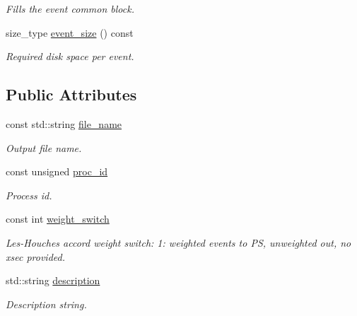 \begin{DoxyCompactItemize}
\begin{DoxyCompactList}\small\item\em Fills the event common block. \end{DoxyCompactList}\item 
\hypertarget{a00327_aab8e06d09a764122a89115144a83fb44}{}size\+\_\+type \hyperlink{a00327_aab8e06d09a764122a89115144a83fb44}{event\+\_\+size} () const \label{a00327_aab8e06d09a764122a89115144a83fb44}

\begin{DoxyCompactList}\small\item\em Required disk space per event. \end{DoxyCompactList}\end{DoxyCompactItemize}
\subsection*{Public Attributes}
\begin{DoxyCompactItemize}
\item 
\hypertarget{a00327_ab375d56ae94afa6c5c27a5e5f937ec44}{}const std\+::string \hyperlink{a00327_ab375d56ae94afa6c5c27a5e5f937ec44}{file\+\_\+name}\label{a00327_ab375d56ae94afa6c5c27a5e5f937ec44}

\begin{DoxyCompactList}\small\item\em Output file name. \end{DoxyCompactList}\item 
\hypertarget{a00327_a0768f1718ffaebf200b096efd5297fd4}{}const unsigned \hyperlink{a00327_a0768f1718ffaebf200b096efd5297fd4}{proc\+\_\+id}\label{a00327_a0768f1718ffaebf200b096efd5297fd4}

\begin{DoxyCompactList}\small\item\em Process id. \end{DoxyCompactList}\item 
const int \hyperlink{a00327_a067bf1d9ce6ef519da53c80d422b89dd}{weight\+\_\+switch}
\begin{DoxyCompactList}\small\item\em Les-\/\+Houches accord weight switch\+: 1\+: weighted events to P\+S, unweighted out, no xsec provided. \end{DoxyCompactList}\item 
\hypertarget{a00327_ac99556b033add683c6699d01af862cf9}{}std\+::string \hyperlink{a00327_ac99556b033add683c6699d01af862cf9}{description}\label{a00327_ac99556b033add683c6699d01af862cf9}

\begin{DoxyCompactList}\small\item\em Description string. \end{DoxyCompactList}\end{DoxyCompactItemize}
